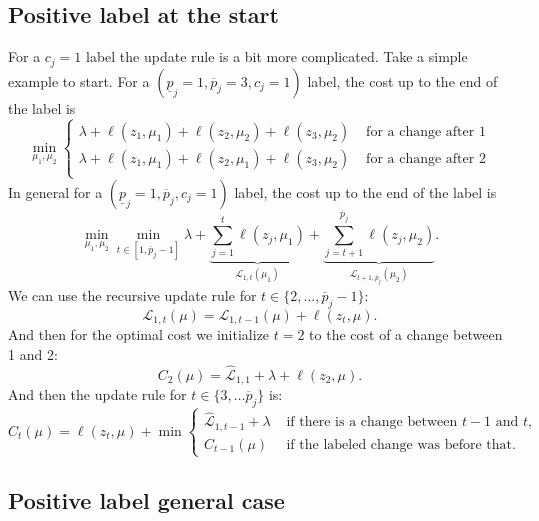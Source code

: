 \documentclass{article}
\begin{document}
\subsection{Positive label at the start}
For a $c_j=1$ label the update rule is a bit more complicated. Take a
simple example to start. For a
$(\underline p_j=1,\overline p_j=3,c_j=1)$ label, the cost up to the
end of the label is
\begin{equation}
  \label{eq:positive_cost}
  \min_{\mu_1, \mu_2}
  \begin{cases}
    \lambda+\ell(z_1,\mu_1) + \ell(z_2, \mu_2)+\ell(z_3, \mu_2) &\text{ for a
      change after 1}\\
    \lambda+\ell(z_1,\mu_1) + \ell(z_2, \mu_1)+\ell(z_3, \mu_2) &\text{ for a
      change after 2}\\
  \end{cases}
\end{equation}
In general for a
$(\underline p_j=1,\overline p_j,c_j=1)$ label, the cost up to the end
of the label is
\begin{equation}
  \label{eq:positive_cost}
  \min_{\mu_1, \mu_2}
  \min_{t\in[1, \overline p_j-1]}
\lambda+
  \underbrace{
    \sum_{j=1}^t \ell(z_j, \mu_1)
  }_{\mathcal L_{1,t}(\mu_1)}+
  \underbrace{
    \sum_{j=t+1}^{\overline p_j}\ell(z_j, \mu_2)
  }_{\mathcal L_{t+1,\overline p_j}(\mu_2)}.
\end{equation}
We can use the recursive update rule for $t\in\{2,\dots, \overline p_j-1\}$:
\begin{equation}
  \mathcal L_{1,t}(\mu) = \mathcal L_{1,t-1}(\mu) +\ell(z_t , \mu).
\end{equation}
And then for the optimal cost we initialize $t=2$ to the cost of a
change between 1 and 2:
\begin{equation}
  C_2(\mu)=\mathcal{\hat L}_{1,1}+\lambda+\ell(z_2,\mu).
\end{equation}
And then
the update rule for
$t\in\{3,\dots \overline p_j\}$ is:
\begin{equation}
  \label{eq:positive_update}
  C_t(\mu)=\ell(z_t, \mu) + \min
  \begin{cases}
\mathcal{\hat L}_{1, t-1}+\lambda &\text{ if there is a change between $t-1$ and $t$,}\\
C_{t-1}(\mu) & \text{ if the labeled change was before that.}
  \end{cases}
\end{equation}
\subsection{Positive label general case}
\end{document}
